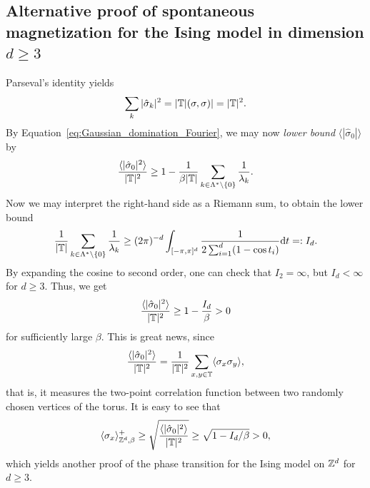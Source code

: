 \subsection{Alternative proof of spontaneous magnetization for the Ising model in
dimension $d\geq 3$}

Parseval's identity yields
\[
    \sum_k |\hat\sigma_k|^2 =  |\mathbb T|(\sigma,\sigma)| = |\mathbb T|^2.
\]
By Equation~\eqref{eq:Gaussian_domination_Fourier},
we may now \emph{lower bound} $\langle|\hat\sigma_0|\rangle$
by
\begin{equation}
    \frac{\langle|\hat\sigma_0|^2\rangle}{|\mathbb T|^2}\geq 1 -
    \frac1{\beta|\mathbb T|}\sum_{k\in\Lambda^*\setminus\{0\}}\frac{1}{\lambda_k}.
\end{equation}
Now we may interpret the right-hand side as a Riemann sum,
to obtain the lower bound
\[
    \frac1{|\mathbb T|}\sum_{k\in\Lambda^*\setminus\{0\}}\frac{1}{\lambda_k}
    \geq
    (2\pi)^{-d}\int_{[-\pi,\pi]^d} \frac1{2\sum_{i=1}^d (1-\cos t_i)}{\mathrm{d}} t=:I_d.
\]
By expanding the cosine to second order, one can check that $I_2=\infty$, but
$I_d<\infty$ for $d\geq 3$.
Thus, we get
\[
    \frac{\langle|\hat\sigma_0|^2\rangle}{|\mathbb T|^2}
    \geq
    1-\frac{I_d}{\beta}>0
\]
for sufficiently large $\beta$.
This is great news,
since
\[
    \frac{\langle|\hat\sigma_0|^2\rangle}{|\mathbb T|^2}
    =
    \frac{1}{|\mathbb T|^2}\sum_{x,y\in \mathbb T} \langle\sigma_x\sigma_y\rangle,
\]
that is, it measures the two-point correlation function between two randomly chosen
vertices of the torus.
It is easy to see that
\[
    \langle\sigma_x\rangle_{\mathbb Z^d,\beta}^+ \geq
    \sqrt{\frac{\langle|\hat\sigma_0|^2\rangle}{|\mathbb T|^2}}
    \geq  \sqrt{1-I_d/\beta}>0,
\]
which yields another proof of the phase transition for the Ising model on $\mathbb Z^d$ for $d\geq 3$.



